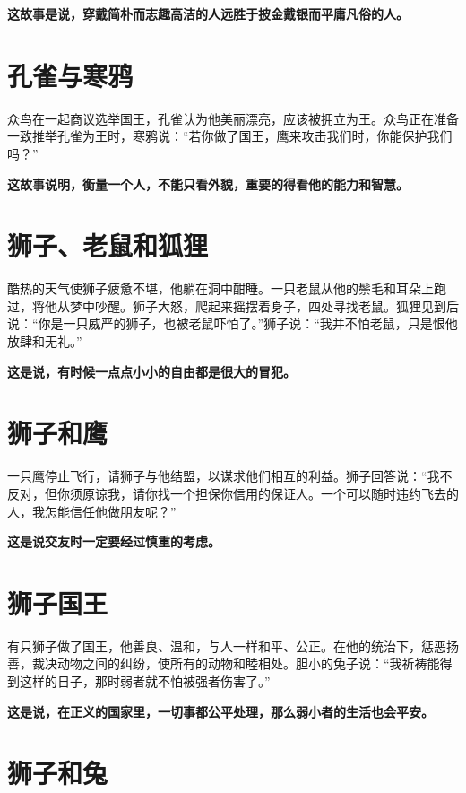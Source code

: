 {\bfseries \color{red}这故事是说，穿戴简朴而志趣高洁的人远胜于披金戴银而平庸凡俗的人。}

\section{孔雀与寒鸦}

众鸟在一起商议选举国王，孔雀认为他美丽漂亮，应该被拥立为王。众鸟正在准备一致推举孔雀为王时，寒鸦说：“若你做了国王，鹰来攻击我们时，你能保护我们吗？”

{\bfseries \color{red}这故事说明，衡量一个人，不能只看外貌，重要的得看他的能力和智慧。}

\section{狮子、老鼠和狐狸}

酷热的天气使狮子疲惫不堪，他躺在洞中酣睡。一只老鼠从他的鬃毛和耳朵上跑过，将他从梦中吵醒。狮子大怒，爬起来摇摆着身子，四处寻找老鼠。狐狸见到后说：“你是一只威严的狮子，也被老鼠吓怕了。”狮子说：“我并不怕老鼠，只是恨他放肆和无礼。”

{\bfseries \color{red}这是说，有时候一点点小小的自由都是很大的冒犯。}

\section{狮子和鹰}

一只鹰停止飞行，请狮子与他结盟，以谋求他们相互的利益。狮子回答说：“我不反对，但你须原谅我，请你找一个担保你信用的保证人。一个可以随时违约飞去的人，我怎能信任他做朋友呢？”

{\bfseries \color{red}这是说交友时一定要经过慎重的考虑。}

\section{狮子国王}

有只狮子做了国王，他善良、温和，与人一样和平、公正。在他的统治下，惩恶扬善，裁决动物之间的纠纷，使所有的动物和睦相处。胆小的兔子说：“我祈祷能得到这样的日子，那时弱者就不怕被强者伤害了。”

{\bfseries \color{red}这是说，在正义的国家里，一切事都公平处理，那么弱小者的生活也会平安。}

\section{狮子和兔}

